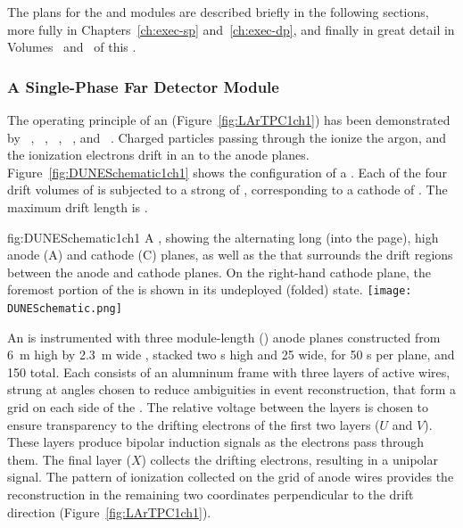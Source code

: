 The plans for the  and  modules are described briefly in the following sections, more fully in Chapters~\ref{ch:exec-sp} and~\ref{ch:exec-dp}, and finally in great detail in Volumes~\volnumbersp{} and~\volnumberdp{} of this . 


\subsubsection{A Single-Phase Far Detector Module}
\label{sec:fdsp-exec-splar}

The operating principle of an   (Figure~\ref{fig:LArTPC1ch1}) has been demonstrated by  ~\cite{Icarus-T600}, ~\cite{microboone}, ~\cite{Anderson:2012vc}, ~\cite{Cavanna:2014iqa}, and ~\cite{Abi:2017aow}. Charged particles passing through the  ionize the argon, and the ionization electrons drift in an \efield{} to the anode planes. Figure~\ref{fig:DUNESchematic1ch1} shows the configuration of a  . Each of the four drift volumes of  is subjected to a strong \efield{} of \spmaxfield, corresponding to a cathode  of \sptargetdriftvoltpos. The maximum drift length is \spmaxdrift.  


\begin{dunefigure}{fig:DUNESchematic1ch1}
{A \nominalmodsize {}  , showing the alternating \sptpclen{} long (into the page), \tpcheight{} high anode (A) and cathode (C) planes, as well as the  that surrounds the drift regions between the anode and cathode planes. On the right-hand cathode plane, the foremost portion of the  is shown in its undeployed (folded) state.}
\texttt{[image: DUNESchematic.png]}
\end{dunefigure}

An  is instrumented with three module-length (\sptpclen) anode planes constructed from \SI{6}{m} high by \SI{2.3}{m} wide , stacked two s high and 25 wide, for 50 s per plane, and 150 total. Each  %
consists of an alumninum frame with three layers of active wires, strung at angles chosen to reduce ambiguities in event reconstruction, that form a grid on each side of the . The relative voltage between the layers is chosen to ensure transparency to the drifting electrons of the first two layers ($U$ and $V$). These layers produce bipolar induction signals as the electrons pass through them. The final layer ($X$) collects the drifting electrons, resulting in a unipolar signal. The pattern of ionization collected on the grid of anode wires provides the reconstruction in the remaining two coordinates perpendicular to the drift direction (Figure~\ref{fig:LArTPC1ch1}).

